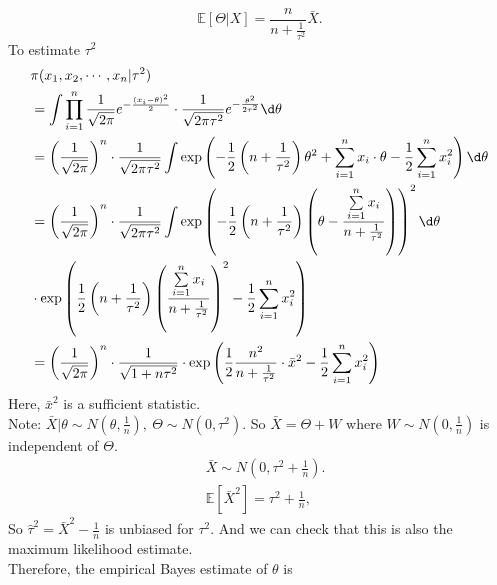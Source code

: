 \documentclass[a4paper]{article}
\begin{document}
\begin{answer}
\begin{enumerate}
\begin{eg}
			\begin{equation*}
				\mathbb{E}[\Theta|X] = \frac{n}{n + \frac{1}{\tau^2}} \bar{X}.
			\end{equation*}
			To estimate $\tau^2$
			\begin{equation*}
				\begin{aligned}
					&\pi(x_1,x_2,\cdots,x_n|\tau^2) \\
					&= \int \prod\limits_{i=1}^n \frac{1}{\sqrt{2 \pi}} e^{-\frac{(x_i-\theta)^2}{2}} \cdot \frac{1}{\sqrt{2 \pi \tau^2}} e^{-\frac{\theta^2}{2\tau^2}} \d \theta \\
					&= \left(\frac{1}{\sqrt{2\pi}}\right)^n \cdot \frac{1}{\sqrt{2 \pi \tau^2}} \int \exp\left(-\frac{1}{2}\left(n + \frac{1}{\tau^2}\right)\theta^2 + \sum\limits_{i=1}^n x_i \cdot \theta - \frac{1}{2}\sum\limits_{i=1}^n x_i^2\right) \d \theta \\
					&= \left(\frac{1}{\sqrt{2\pi}}\right)^n \cdot \frac{1}{\sqrt{2 \pi \tau^2}} \int \exp\left(-\frac{1}{2}\left(n + \frac{1}{\tau^2}\right)\left(\theta - \frac{\sum\limits_{i=1}^n x_i}{n + \frac{1}{\tau^2}}\right)\right)^2 \d \theta \\
					&\cdot \exp\left(\frac{1}{2}\left(n + \frac{1}{\tau^2}\right)\left(\frac{\sum\limits_{i=1}^n x_i}{n + \frac{1}{\tau^2}}\right)^2 - \frac{1}{2}\sum\limits_{i=1}^n x_i^2\right) \\
					&= \left(\frac{1}{\sqrt{2\pi}}\right)^n \cdot \frac{1}{\sqrt{1 + n\tau^2}} \cdot \exp\left(\frac{1}{2}\frac{n^2}{n + \frac{1}{\tau^2}} \cdot \bar{x}^2 - \frac{1}{2}\sum\limits_{i=1}^n x_i^2\right)
				\end{aligned}
			\end{equation*}
			Here, $\bar{x}^2$ is a sufficient statistic.\\
			Note: $\bar{X} | \theta \sim N(\theta,\frac{1}{n}), \ \Theta \sim N(0,\tau^2)$. So $\bar{X} = \Theta + W \text{ where } W \sim N(0,\frac{1}{n})$ is independent of $\Theta$.
			\begin{equation*}
				\begin{aligned}
					& \bar{X} \sim N\left(0,\tau^2+\frac{1}{n}\right). \\
					& \mathbb{E}[\bar{X}^2] = \tau^2+\frac{1}{n}, 
				\end{aligned}
			\end{equation*}
			So $\hat{\tau}^2 = \bar{X}^2 - \frac{1}{n}$ is unbiased for $\tau^2$. And we can check that this is also the maximum likelihood estimate.\\
			Therefore, the empirical Bayes estimate of $\theta$ is

\end{eg}
\end{enumerate}
\end{answer}
\end{document}
